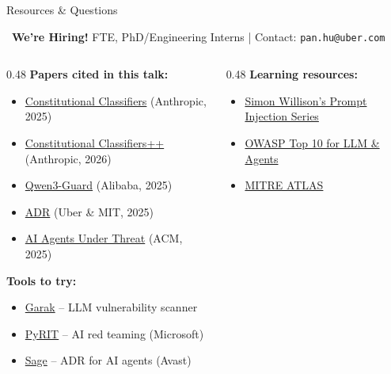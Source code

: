 \documentclass[aspectratio=169,9pt]{beamer}
\begin{document}
\begin{frame}{Resources \& Questions}

\begin{bluebox}
\faUsers\ \textbf{We're Hiring!} \quad FTE, PhD/Engineering Interns \quad | \quad Contact: \texttt{pan.hu@uber.com}
\end{bluebox}

\vspace{0.3em}
\begin{columns}[T]
\begin{column}{0.48\textwidth}
\textbf{Papers cited in this talk:}
\begin{itemize}\scriptsize
  \item \href{https://arxiv.org/abs/2501.18837}{Constitutional Classifiers} (Anthropic, 2025)
  \item \href{https://arxiv.org/abs/2601.04603}{Constitutional Classifiers++} (Anthropic, 2026)
  \item \href{https://arxiv.org/abs/2505.14727}{Qwen3-Guard} (Alibaba, 2025)
  \item \href{https://arxiv.org/abs/2503.11009}{ADR} (Uber \& MIT, 2025)
  \item \href{https://arxiv.org/abs/2406.02630}{AI Agents Under Threat} (ACM, 2025)
\end{itemize}

\vspace{0.3em}
\textbf{Tools to try:}
\begin{itemize}\scriptsize
  \item \href{https://github.com/leondz/garak}{Garak} -- LLM vulnerability scanner
  \item \href{https://github.com/Azure/PyRIT}{PyRIT} -- AI red teaming (Microsoft)
  \item \href{https://github.com/avast/sage}{Sage} -- ADR for AI agents (Avast)
\end{itemize}
\end{column}

\begin{column}{0.48\textwidth}
\textbf{Learning resources:}
\begin{itemize}\scriptsize
  \item \href{https://simonwillison.net/series/prompt-injection}{Simon Willison's Prompt Injection Series}
  \item \href{https://genai.owasp.org}{OWASP Top 10 for LLM \& Agents}
  \item \href{https://atlas.mitre.org}{MITRE ATLAS}
\end{itemize}


\end{column}
\end{columns}
\end{frame}
\end{document}
